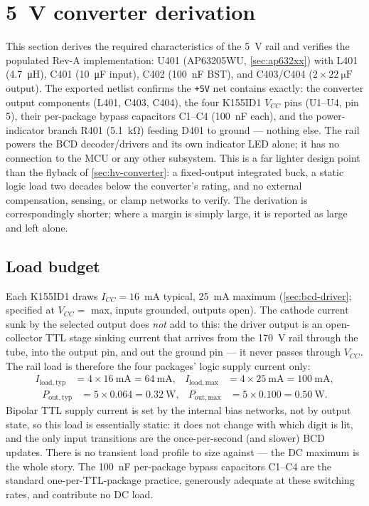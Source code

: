 \section{5~V converter derivation}\label{sec:5v-converter}

This section derives the required characteristics of the 5~V rail and verifies the
populated Rev-A implementation: U401 (AP63205WU, \cref{sec:ap632xx}) with L401
(\SI{4.7}{\micro\henry}), C401 (\SI{10}{\micro\farad} input), C402 (\SI{100}{\nano\farad}
BST), and C403/C404 ($2\times\SI{22}{\micro\farad}$ output). The exported netlist confirms
the \texttt{+5V} net contains exactly: the converter output components (L401, C403, C404),
the four K155ID1 $V_{CC}$ pins (U1--U4, pin 5), their per-package bypass capacitors
C1--C4 (\SI{100}{\nano\farad} each), and the power-indicator branch R401
(\SI{5.1}{\kilo\ohm}) feeding D401 to ground --- nothing else. The rail powers the BCD
decoder/drivers and its own indicator LED alone; it has no connection to the MCU or any
other subsystem. This is a
far lighter design point than the flyback of \cref{sec:hv-converter}: a fixed-output
integrated buck, a static logic load two decades below the converter's rating, and no
external compensation, sensing, or clamp networks to verify. The derivation is
correspondingly shorter; where a margin is simply large, it is reported as large and left
alone.

\subsection{Load budget}\label{sec:5v-load}

Each K155ID1 draws $I_{CC} = 16$~mA typical, \SI{25}{\milli\ampere} maximum
(\cref{sec:bcd-driver}; specified at $V_{CC}=$ max, inputs grounded, outputs open). The
cathode current sunk by the selected output does \emph{not} add to this: the driver output
is an open-collector TTL stage sinking current that arrives from the 170~V rail through
the tube, into the output pin, and out the ground pin --- it never passes through
$V_{CC}$. The rail load is therefore the four packages' logic supply current only:
\begin{align*}
  I_{\mathrm{load,typ}} &= 4 \times \SI{16}{\milli\ampere} = \SI{64}{\milli\ampere}, &
  I_{\mathrm{load,max}} &= 4 \times \SI{25}{\milli\ampere} = \SI{100}{\milli\ampere},
\end{align*}
\begin{align*}
  P_{\mathrm{out,typ}} &= 5 \times 0.064 = \SI{0.32}{\watt}, &
  P_{\mathrm{out,max}} &= 5 \times 0.100 = \SI{0.50}{\watt}.
\end{align*}
Bipolar TTL supply current is set by the internal bias networks, not by output state, so
this load is essentially static: it does not change with which digit is lit, and the only
input transitions are the once-per-second (and slower) BCD updates. There is no transient
load profile to size against --- the DC maximum is the whole story. The
\SI{100}{\nano\farad} per-package bypass capacitors C1--C4 are the standard one-per-TTL-package
practice, generously adequate at these switching rates, and contribute no DC load.

